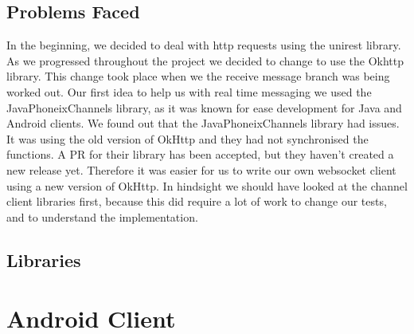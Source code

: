 \documentclass[11pt,a4paper]{report}
\begin{document}
\subsection{Problems Faced}
In the beginning, we decided to deal with http requests using the unirest library. As we progressed throughout the project we decided to change to use the Okhttp library. This change took place when we the receive message branch was being worked out. Our first idea to help us with real time messaging we used the JavaPhoneixChannels library, as it was known for ease development for Java and Android clients. We found out that the JavaPhoneixChannels library had issues. It was using the old version of OkHttp and they had not synchronised the functions. A PR for their library has been accepted, but they haven’t created a new release yet. Therefore it was easier for us to write our own websocket client using a new version of OkHttp. In hindsight we should have looked at the channel client libraries first, because this did require a lot of work to change our tests, and to understand the implementation.  

\subsection{Libraries}

\section{Android Client}
\end{document}
